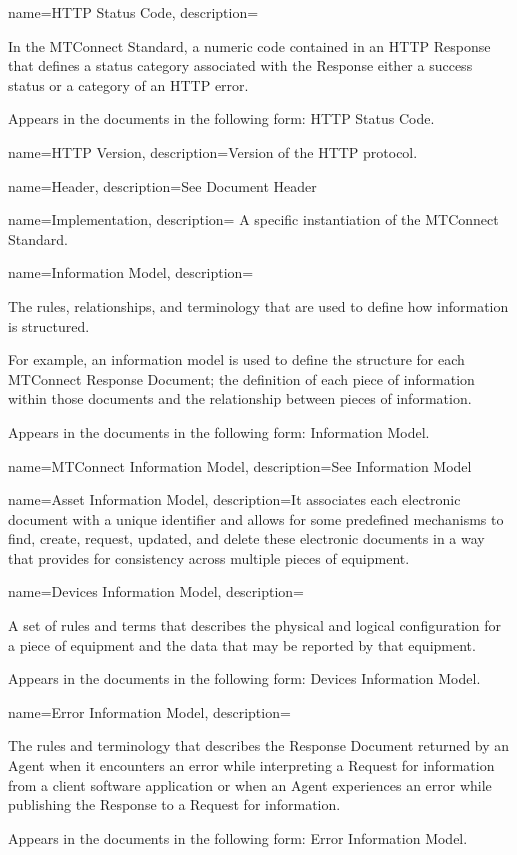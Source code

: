 {
    name={HTTP Status Code},
	description={
	In the MTConnect Standard, a numeric code contained in an \gls{HTTP Response} that defines a status category associated with the \gls{Response}  either a success status or a category of an HTTP error.  

	Appears in the documents in the following form: \gls{HTTP Status Code}.
}
}

{
    name={HTTP Version},
	description={Version of the HTTP protocol.}
}

{
    name={Header},
	description={See \gls{Document Header}}
}

{
    name={Implementation},
	description={
	A specific instantiation of the MTConnect Standard.
}
}

{
    name={Information Model},
	description={
	The rules, relationships, and terminology that are used to define how information is structured.

	For example, an information model is used to define the structure for each \gls{MTConnect Response Document}; the definition of each piece of information within those documents and the relationship between pieces of information.

	Appears in the documents in the following form: \gls{Information Model}.
}
}

{
    name={MTConnect Information Model},
	description={See \gls{Information Model}}
}

{
    name={Asset Information Model},
	description={It associates each electronic  document with a unique identifier and allows for some predefined mechanisms to find, create, request, updated, and delete these electronic documents in a way that provides for consistency across multiple pieces of equipment.}
}

{
    name={Devices Information Model},
	description={
	A set of rules and terms that describes the physical and logical configuration for a piece of equipment and the data that may be reported by that equipment.    

	Appears in the documents in the following form: \gls{Devices Information Model}.
}
}

{
    name={Error Information Model},
	description={
	The rules and terminology that describes the \gls{Response Document} returned by an \gls{Agent} when it encounters an error while interpreting a \gls{Request} for information from a client software application or when an \gls{Agent} experiences an error while publishing the \gls{Response} to a \gls{Request} for information.

	Appears in the documents in the following form: \gls{Error Information Model}.
}
}

